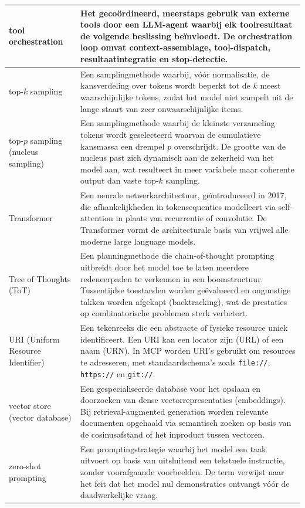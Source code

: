 \begin{longtable}{p{} p{}}
tool orchestration &
    Het gecoördineerd, meerstaps gebruik van externe tools door een LLM-agent waarbij elk toolresultaat de volgende beslissing beïnvloedt. De orchestration loop omvat context-assemblage, tool-dispatch, resultaatintegratie en stop-detectie. \\
\midrule

top-$k$ sampling &
    Een samplingmethode waarbij, vóór normalisatie, de kansverdeling over tokens wordt beperkt tot de $k$ meest waarschijnlijke tokens, zodat het model niet sampelt uit de lange staart van zeer onwaarschijnlijke items. \\
\midrule

top-$p$ sampling \newline \small(nucleus sampling) &
    Een samplingmethode waarbij de kleinste verzameling tokens wordt geselecteerd waarvan de cumulatieve kansmassa een drempel $p$ overschrijdt. De grootte van de nucleus past zich dynamisch aan de zekerheid van het model aan, wat resulteert in meer variabele maar coherente output dan vaste top-$k$ sampling. \\
\midrule

Transformer &
    Een neurale netwerkarchitectuur, geïntroduceerd in 2017, die afhankelijkheden in tokensequenties modelleert via self-attention in plaats van recurrentie of convolutie. De Transformer vormt de architecturale basis van vrijwel alle moderne large language models. \\
\midrule

Tree of Thoughts \newline \small(ToT) &
    Een planningmethode die chain-of-thought prompting uitbreidt door het model toe te laten meerdere redeneerpaden te verkennen in een boomstructuur. Tussentijdse toestanden worden geëvalueerd en ongunstige takken worden afgekapt (backtracking), wat de prestaties op combinatorische problemen sterk verbetert. \\
\midrule

URI \newline \small(Uniform Resource Identifier) &
    Een tekenreeks die een abstracte of fysieke resource uniek identificeert. Een URI kan een locator zijn (URL) of een naam (URN). In MCP worden URI's gebruikt om resources te adresseren, met standaardschema's zoals \texttt{file://}, \texttt{https://} en \texttt{git://}. \\
\midrule

vector store \newline \small(vector database) &
    Een gespecialiseerde database voor het opslaan en doorzoeken van dense vectorrepresentaties (embeddings). Bij retrieval-augmented generation worden relevante documenten opgehaald via semantisch zoeken op basis van de cosinusafstand of het inproduct tussen vectoren. \\
\midrule

zero-shot prompting &
    Een promptingstrategie waarbij het model een taak uitvoert op basis van uitsluitend een tekstuele instructie, zonder voorafgaande voorbeelden. De term verwijst naar het feit dat het model nul demonstraties ontvangt vóór de daadwerkelijke vraag. \\

\end{longtable}